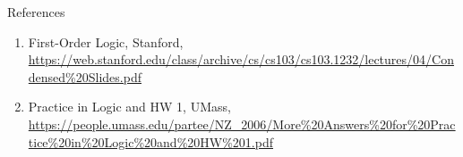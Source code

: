 \documentclass{beamer}
\begin{document}
\begin{frame}{References}
	\begin{enumerate}
		\item First-Order Logic, Stanford, \url{https://web.stanford.edu/class/archive/cs/cs103/cs103.1232/lectures/04/Condensed\%20Slides.pdf}
		\item Practice in Logic and HW 1, UMass, \url{https://people.umass.edu/partee/NZ_2006/More\%20Answers\%20for\%20Practice\%20in\%20Logic\%20and\%20HW\%201.pdf}
	\end{enumerate}
\end{frame}

%	
%	
%

%
%
%
%
\end{document}

